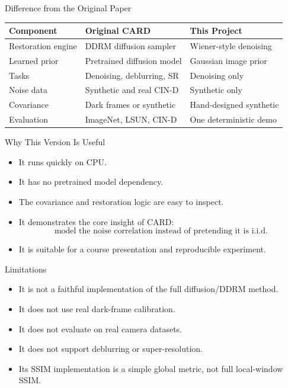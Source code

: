 \documentclass[aspectratio=169]{beamer}
\begin{document}
\begin{frame}{Difference from the Original Paper}
  \begin{table}
    \centering
    \small
    \begin{tabular}{lll}
      \toprule
      Component & Original CARD & This Project \\
      \midrule
      Restoration engine & DDRM diffusion sampler & Wiener-style denoising \\
      Learned prior & Pretrained diffusion model & Gaussian image prior \\
      Tasks & Denoising, deblurring, SR & Denoising only \\
      Noise data & Synthetic and real CIN-D & Synthetic only \\
      Covariance & Dark frames or synthetic & Hand-designed synthetic \\
      Evaluation & ImageNet, LSUN, CIN-D & One deterministic demo \\
      \bottomrule
    \end{tabular}
  \end{table}
\end{frame}

\begin{frame}{Why This Version Is Useful}
  \begin{itemize}
    \item It runs quickly on CPU.
    \item It has no pretrained model dependency.
    \item The covariance and restoration logic are easy to inspect.
    \item It demonstrates the core insight of CARD:
      \[
        \text{model the noise correlation instead of pretending it is i.i.d.}
      \]
    \item It is suitable for a course presentation and reproducible experiment.
  \end{itemize}
\end{frame}

\begin{frame}{Limitations}
  \begin{itemize}
    \item It is not a faithful implementation of the full diffusion/DDRM method.
    \item It does not use real dark-frame calibration.
    \item It does not evaluate on real camera datasets.
    \item It does not support deblurring or super-resolution.
    \item Its SSIM implementation is a simple global metric, not full local-window SSIM.
  \end{itemize}
\end{frame}
\end{document}
